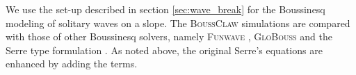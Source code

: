 \documentclass[review]{elsarticle}
\newcommand{\BoussClaw}{\textsc{BoussClaw} }
\begin{document}
We use the set-up described in section \ref{sec:wave_break} for the Boussinesq modeling of solitary waves on a slope. 
The \BoussClaw simulations are compared
with those of other Boussinesq solvers, namely
 \textsc{Funwave} \citep{shi2012high}, \textsc{GloBouss} \citep{lovholt2010coupling} and the Serre type formulation \citep{Lovholt:2013a}.
As noted above, 
the original Serre's equations are enhanced by adding the \citet{schaffer1993boussinesq} terms. 
\end{document}

